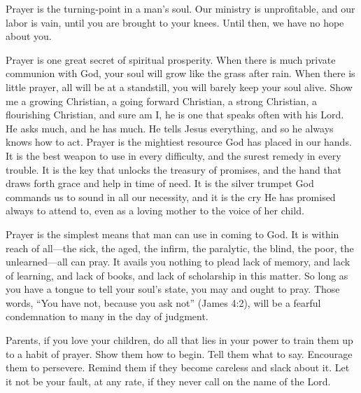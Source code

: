 \documentclass[
]{book}
\begin{document}
Prayer is the turning-point in a man's soul. Our ministry is unprofitable, and our labor is vain, until you are brought to your knees. Until then, we have no hope about you.

Prayer is one great secret of spiritual prosperity. When there is much private communion with God, your soul will grow like the grass after rain. When there is little prayer, all will be at a standstill, you will barely keep your soul alive. Show me a growing Christian, a going forward Christian, a strong Christian, a flourishing Christian, and sure am I, he is one that speaks often with his Lord. He asks much, and he has much. He tells Jesus everything, and so he always knows how to act. Prayer is the mightiest resource God has placed in our hands. It is the best weapon to use in every difficulty, and the surest remedy in every trouble. It is the key that unlocks the treasury of promises, and the hand that draws forth grace and help in time of need. It is the silver trumpet God commands us to sound in all our necessity, and it is the cry He has promised always to attend to, even as a loving mother to the voice of her child.

Prayer is the simplest means that man can use in coming to God. It is within reach of all---the sick, the aged, the infirm, the paralytic, the blind, the poor, the unlearned---all can pray. It avails you nothing to plead lack of memory, and lack of learning, and lack of books, and lack of scholarship in this matter. So long as you have a tongue to tell your soul's state, you may and ought to pray. Those words, ``You have not, because you ask not'' (James 4:2), will be a fearful condemnation to many in the day of judgment.

Parents, if you love your children, do all that lies in your power to train them up to a habit of prayer. Show them how to begin. Tell them what to say. Encourage them to persevere. Remind them if they become careless and slack about it. Let it not be your fault, at any rate, if they never call on the name of the Lord.
\end{document}
